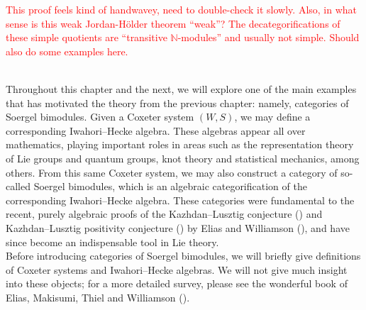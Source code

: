 \noindent\textcolor{red}{This proof feels kind of handwavey, need to double-check it slowly. Also, in what sense is this weak Jordan-H\"{o}lder theorem ``weak''? The decategorifications of these simple quotients are ``transitive $\mathbb{N}$-modules'' and usually not simple. Should also do some examples here.}\\
\newpage

\noindent\\ Throughout this chapter and the next, we will explore one of the main examples that has motivated the theory from the previous chapter: namely, categories of Soergel bimodules. %
Given a Coxeter system $(W, S)$, we may define a corresponding Iwahori--Hecke algebra. These algebras appear all over mathematics, playing important roles in areas such as the representation theory of Lie groups and quantum groups, knot theory and statistical mechanics, among others. From this same Coxeter system, we may also construct a category of so-called Soergel bimodules, which is an algebraic categorification of the corresponding Iwahori--Hecke algebra. These categories were fundamental to the recent, purely algebraic proofs of the Kazhdan--Lusztig conjecture (\cite[Conjecture 1.5]{KL79}) and Kazhdan--Lusztig positivity conjecture (\cite[p.\ 166]{KL79}) by Elias and Williamson (\cite[Theorem 1.1 and Corollary 1.2, respectively]{EW14}), and have since become an indispensable tool in Lie theory.\\

\noindent Before introducing categories of Soergel bimodules, we will briefly give definitions of Coxeter systems and Iwahori--Hecke algebras. We will not give much insight into these objects; for a more detailed survey, please see the wonderful book of Elias, Makisumi, Thiel and Williamson (\cite{EMTW20}).\\

